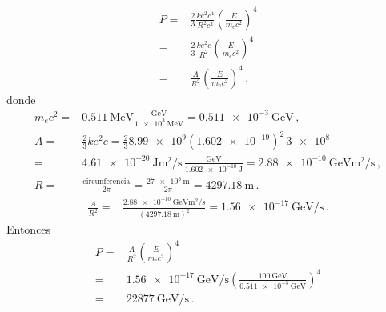 \documentclass[12pt, a4paper]{article}
\begin{document}
\begin{solution}
\begin{align*}
    P =  &  \frac{2}{3} \frac{k e^2 c^4}{R^2c^3}\left(\frac{E}{m_ec^2}\right)^4\\
     =  &  \frac{2}{3} \frac{k e^2 c}{R^2}\left(\frac{E}{m_ec^2}\right)^4\\
    =& \frac{A}{R^2} \left(\frac{E}{m_ec^2}\right)^4\,,
\end{align*}
donde
\begin{align}
    m_e c^2 =& \qty{0.511}{\mega\electronvolt}\frac{\unit{\giga\electronvolt}}{\qty{1e3}{\mega\electronvolt}} = \qty{0.511e-3}{\giga\electronvolt}\,,\\
    A =&\frac{2 }{3}  {k e^2 c}=\frac{2}{3}  {\num{8.99e9} (\num{1.602e-19})^2\,\num{3e8} }\nonumber\\
    =&\qty{4.61e-20}{\joule\meter\squared\per\second}\,\frac{\unit{\giga\electronvolt}}{\qty{1.602e-10}{\joule}}=\qty{2.88e-10}{\giga\electronvolt\meter\squared\per\second}\,,\\
    R =& \frac{\text{circunferencia}}{2\pi} = \frac{\qty{27e3}{\meter}}{2\pi} = \qty{4297.18}{\meter}\,.
\end{align}
\begin{align*}
    \frac{A}{R^2} =&\frac{\qty{2.88e-10}{\giga\electronvolt\meter\squared\per\second}}{(\qty{4297.18}{\meter})^2}
     =\qty{1.56e-17}{\giga\electronvolt\per\second}\,.
\end{align*}
Entonces
\begin{align*}
    P =& \frac{A}{R^2}\left(\frac{E}{m_ec^2}\right)^4\\
    =& \qty{1.56e-17}{\giga\electronvolt\per\second}\left(\frac{\qty{100}{\giga\electronvolt}}{\qty{0.511e-3}{\giga\electronvolt}}\right)^4\\
    =& \qty{22877}{\giga\electronvolt\per\second}\,.
\end{align*}
\end{solution}
\end{document}

